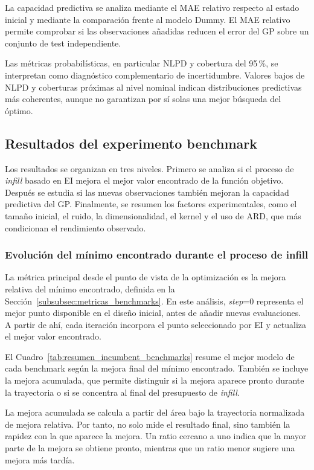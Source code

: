 La capacidad predictiva se analiza mediante el MAE relativo respecto al estado inicial y mediante la comparación frente al modelo Dummy. El MAE relativo permite comprobar si las observaciones añadidas reducen el error del GP sobre un conjunto de test independiente. 

Las métricas probabilísticas, en particular NLPD y cobertura del 95\,\%, se interpretan como diagnóstico complementario de incertidumbre. Valores bajos de NLPD y coberturas próximas al nivel nominal indican distribuciones predictivas más coherentes, aunque no garantizan por sí solas una mejor búsqueda del óptimo.


\subsection{Resultados del experimento benchmark}
\label{subsec:resultados_benchmarks}

Los resultados se organizan en tres niveles. Primero se analiza si el proceso de \emph{infill} basado en EI mejora el mejor valor encontrado de la función objetivo. Después se estudia si las nuevas observaciones también mejoran la capacidad predictiva del GP. Finalmente, se resumen los factores experimentales, como el tamaño inicial, el ruido, la
dimensionalidad, el kernel y el uso de ARD, que más condicionan el rendimiento observado.

\subsubsection{Evolución del mínimo encontrado durante el proceso de infill}
\label{subsubsec:resultados_incumbent_benchmarks}

La métrica principal desde el punto de vista de la optimización es la mejora relativa del mínimo encontrado, definida en la Sección~\ref{subsubsec:metricas_benchmarks}. En este análisis, \emph{step}=0 representa el mejor punto disponible en el diseño inicial, antes de añadir nuevas evaluaciones. A partir de ahí, cada iteración incorpora el punto seleccionado por EI y actualiza el mejor valor encontrado.

El Cuadro~\ref{tab:resumen_incumbent_benchmarks} resume el mejor modelo de cada benchmark según la mejora final del mínimo encontrado. También se incluye la mejora acumulada, que permite distinguir si la mejora aparece pronto durante la trayectoria o si se concentra al final del presupuesto de \emph{infill}.

La mejora acumulada se calcula a partir del área bajo la trayectoria normalizada de mejora relativa. Por tanto, no solo mide el resultado final, sino también la rapidez con la que aparece la mejora. Un ratio cercano a uno indica que la mayor parte de la mejora se obtiene pronto, mientras que un ratio menor sugiere una mejora más tardía.

